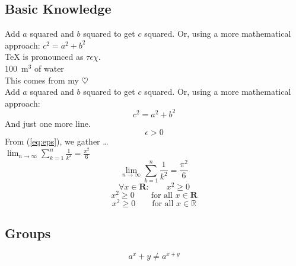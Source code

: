 \documentclass[a4paper,11pt]{article}
\begin{document}
\subsection{Basic Knowledge}
Add $a$ squared and $b$ squared to get
$c$ squared. Or, using a more mathematical
approach: $c^2=a^2+b^2$ \\
\TeX{} is pronounced as $\tau\epsilon\chi$. \\[6pt]
100~m$^{3}$ of water\\[6pt]
This comes from my $\heartsuit$\\
Add $a$ squared and $b$ squared to get $c$ squared.
Or, using a more mathematical approach:
\begin{displaymath}
    c^2=a^2+b^2
\end{displaymath}
And just one more line.\\
\begin{equation}
    \label{eq:eps}
    \epsilon > 0    
\end{equation}
From (\ref{eq:eps}), we gather \ldots\\
$\lim_{n \to \infty}
\sum_{k=1}^n \frac{1}{k^2}
= \frac{\pi^2}{6}
$
\begin{displaymath}
    \lim_{n \to \infty}
    \sum_{k=1}^n\frac{1}{k^2}
    = \frac{\pi^2}{6}
\end{displaymath}
\begin{equation}
    \forall x \in \mathbf{R}:
    \qquad x^2 \geq 0
\end{equation}
\begin{equation}
    x^2 \geq 0\qquad
    \textrm{for all }x \in \mathbf{R}
\end{equation}
\begin{displaymath}
    x^2 \geq 0 \qquad
    \textrm{for all } x \in \mathbb{R}
\end{displaymath}
\subsection{Groups}
\begin{equation}
    a^x+y \neq a^{x+y}
\end{equation}
\end{document}
